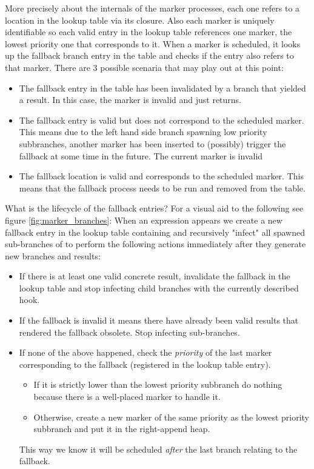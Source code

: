More precisely about the internals of the marker processes, each one
refers to a location in the lookup table via its closure. Also each
marker is uniquely identifiable so each valid entry in the lookup
table references one marker, the lowest priority one that corresponds
to it. When a marker is scheduled, it looks up the fallback branch
entry in the table and checks if the entry also refers to that
marker. There are 3 possible scenaria that may play out at this point:

\begin{itemize}
\item The fallback entry in the table has been invalidated by a branch
  that yielded a result. In this case, the marker is invalid and just
  returns.
\item The fallback entry is valid but does not correspond to the
  scheduled marker. This means due to the left hand side branch
  spawning low priority subbranches, another marker has been inserted
  to (possibly) trigger the fallback at some time in the future. The
  current marker is invalid
\item The fallback location is valid and corresponds to the scheduled
  marker. This means that the fallback process needs to be run
  and removed from the table.
\end{itemize}

What is the lifecycle of the fallback entries? For a visual aid to the
following see figure \ref{fig:marker_branches}: When an expression
 appears we create a new fallback entry in the lookup
table containing  and recursively "infect" all spawned
sub-branches of  to perform the following actions immediately
after they generate new branches and results:

\begin{itemize}
\item If there is at least one valid concrete result, invalidate the
  fallback in the lookup table and stop infecting child branches with
  the currently described hook.
\item If the fallback is invalid it means there have already been
  valid results that rendered the fallback obsolete. Stop infecting
  sub-branches.
\item If none of the above happened, check the \emph{priority} of the
  last marker corresponding to the fallback (registered in the lookup
  table entry).

  \begin{itemize}
  \item If it is strictly lower than the lowest priority
    subbranch do nothing because there is a well-placed marker to handle
    it.
  \item Otherwise, create a new marker of the same priority as the
    lowest priority subbranch and put it in the right-append heap.
  \end{itemize}

  This way we know it will be scheduled \emph{after} the last branch
  relating to the fallback.
\end{itemize}


